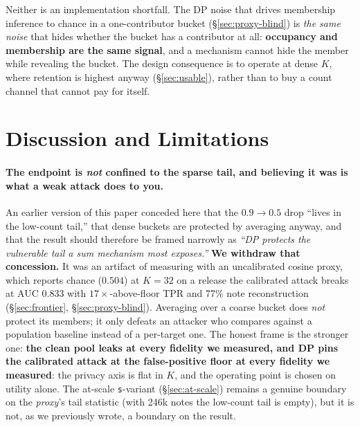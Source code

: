 \documentclass[pdflatex,sn-mathphys-num,iicol]{sn-jnl}
\theoremstyle{thmstyleone}%
\theoremstyle{thmstyletwo}%
\theoremstyle{thmstylethree}%
\newcommand{\secref}[1]{\S\ref{#1}}
\begin{document}
Neither is an implementation shortfall. The DP noise that drives membership inference to chance in
a one-contributor bucket (\secref{sec:proxy-blind}) is \emph{the same noise} that hides whether the
bucket has a contributor at all: \textbf{occupancy and membership are the same signal}, and a
mechanism cannot hide the member while revealing the bucket. The design consequence is to operate at
dense $K$, where retention is highest anyway (\secref{sec:usable}), rather than to buy a count
channel that cannot pay for itself.

\section{Discussion and Limitations}\label{sec:discussion}

\paragraph{The endpoint is \emph{not} confined to the sparse tail, and believing it was is
what a weak attack does to you.} An earlier version of this paper conceded here that the
$0.9 \to 0.5$ drop ``lives in the low-count tail,'' that dense buckets are protected by
averaging anyway, and that the result should therefore be framed narrowly as \emph{``DP
protects the vulnerable tail a sum mechanism most exposes.''} \textbf{We withdraw that
concession.} It was an artifact of measuring with an uncalibrated cosine proxy, which reports
chance ($0.504$) at $K = 32$ on a release the calibrated attack breaks at AUC $0.833$ with
$17\times$-above-floor TPR and 77\% note reconstruction (\secref{sec:frontier},
\secref{sec:proxy-blind}). Averaging over a coarse bucket does \emph{not} protect its members;
it only defeats an attacker who compares against a population baseline instead of a per-target
one. The honest frame is the stronger one: \textbf{the clean pool leaks at every fidelity we
measured, and DP pins the calibrated attack at the false-positive floor at every fidelity we
measured}: the privacy axis is flat in $K$, and the operating point is chosen on utility
alone. The at-scale \texttt{s}-variant (\secref{sec:at-scale}) remains a genuine boundary on the
\emph{proxy}'s tail statistic (with 246k notes the low-count tail is empty), but it is not, as we
previously wrote, a boundary on the result.
\end{document}
